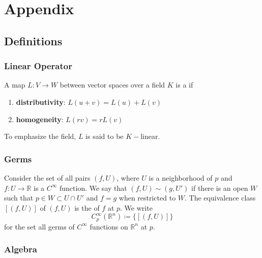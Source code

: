 \section{Appendix}\label{sec:appendix}
\localtableofcontents

\subsection{Definitions}

\subsubsection{Linear Operator}\label{subsubsec:linearoperator}

A map \(L \colon V \rightarrow W\) between vector spaces over a field \(K\) is a  if 
%
\begin{enumerate}
    \item \textbf{distributivity}: \(L(u+v) = L(u) + L(v)\)
    \item \textbf{homogeneity}: \(L(rv) = r L(v)\)
\end{enumerate}
%
To emphasize the field, \(L\) is said to be \(K-\)linear.

\subsubsection{Germs}

Consider the set of all pairs \((f, U)\), where \(U\) is a neighborhood of \(p\) and \(f\colon U \rightarrow \mathbb{R}\) is a \(C^\infty\) function.
%
We say that \((f, U) \sim (g, U')\) if there is an open \(W\) such that \(p \in W \subset U \cap U'\) and \(f = g\) when restricted to \(W\).
%
The equivalence class \([(f, U)]\) of \((f, U)\) is the  of \(f\) at \(p\).
%
We write
%
\begin{equation}
    C_p^\infty(\mathbb{R}^n) \coloneqq \{[(f, U)]\}
\end{equation}
%
for the set all germs of \(C^\infty\) functions on \(\mathbb{R}^n\) at \(p\).

\subsubsection{Algebra}\label{subsubsec:algebra}

